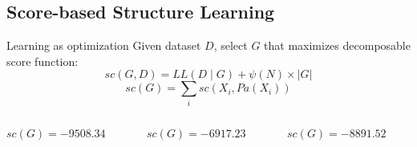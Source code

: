 \subsection{Score-based Structure Learning}

\begin{frame}
	\begin{block}{Learning as optimization}
		Given dataset $D$, select $G$ that maximizes \alert{decomposable} score function:
			\[ {sc}( G , D ) = LL( D \mid G ) + \psi( N ) \times | G | \]
			\[ {sc}( G ) = \sum_i {sc}( X_i , {Pa}( X_i ) ) \]
	\end{block}
\end{frame}
	
\begin{frame}[fragile]
	\begin{columns}
		\begin{column}{.3\textwidth}
			\begin{figure}
				\centering
				
			\end{figure}
			\centering
			${sc}( G ) = -9508.34$
		\end{column}
		\begin{column}{.3\textwidth}
			\begin{figure}
				\centering
				
			\end{figure}
			\centering
			${sc}( G ) = -6917.23$
		\end{column}
		\begin{column}{.3\textwidth}
			\begin{figure}
				\centering
				
			\end{figure}
			\centering
			${sc}( G ) = -8891.52$
		\end{column}
	\end{columns}
\end{frame}